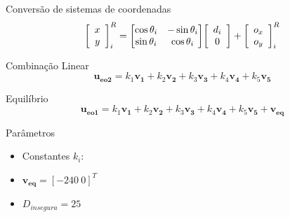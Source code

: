 \begin{frame}
	\begin{block}{Conversão de sistemas de coordenadas}
		\begin{equation}
			\mleft[ 
			\begin{array}{c c}
				x \\ y
			\end{array}
			\mright]_i^R = \mleft[
			\begin{matrix}
		  		\cos{\theta_i} & -\sin{\theta_i} \\
		  		\sin{\theta_i} & \cos{\theta_i} \\
			\end{matrix}
			\mright] \mleft[ 
			\begin{array}{c c}
				d_i \\ 0
			\end{array}
			\mright] + \mleft[ 
			\begin{array}{c c}
				o_x \\ o_y
			\end{array}
			\mright]_i^R
		\end{equation}
	\end{block}
	
	\pause
	\begin{exampleblock}{Combinação Linear}
		\begin{equation}
			\mathbf{u_{eo2}} = k_1 \mathbf{v_1} + k_2 \mathbf{v_2} + k_3 \mathbf{v_3} + 
			k_4 \mathbf{v_4} + k_5 \mathbf{v_5}
		\end{equation}
	\end{exampleblock}
	
	\pause
	\begin{block}{Equilíbrio}
		\begin{equation}
			\mathbf{u_{eo1}} = k_1 \mathbf{v_1} + k_2 \mathbf{v_2} + k_3 \mathbf{v_3} + 
			k_4 \mathbf{v_4} + k_5 \mathbf{v_5} + \mathbf{v_{eq}}
		\end{equation}
	\end{block}
\end{frame}

\begin{frame}
	\begin{block}{Parâmetros}
		\begin{itemize}
		  \item Constantes $k_i$:
		  \pause
		  \item $\mathbf{v_{eq}} = [-240 \ 0]^T$
		  \pause
		  \item $D_{insegura} = 25$
		\end{itemize}
	\end{block}
\end{frame}

